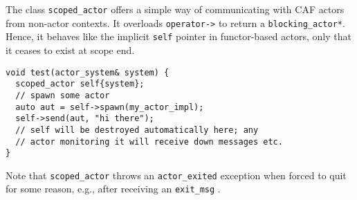 The class \lstinline^scoped_actor^ offers a simple way of communicating with CAF actors from non-actor contexts.
It overloads \lstinline^operator->^ to return a \lstinline^blocking_actor*^.
Hence, it behaves like the implicit \lstinline^self^ pointer in functor-based actors, only that it ceases to exist at scope end.

\begin{lstlisting}
void test(actor_system& system) {
  scoped_actor self{system};
  // spawn some actor
  auto aut = self->spawn(my_actor_impl);
  self->send(aut, "hi there");
  // self will be destroyed automatically here; any
  // actor monitoring it will receive down messages etc.
}
\end{lstlisting}

Note that \lstinline^scoped_actor^ throws an \lstinline^actor_exited^ exception when forced to quit for some reason, e.g., after receiving an \lstinline^exit_msg^ .
